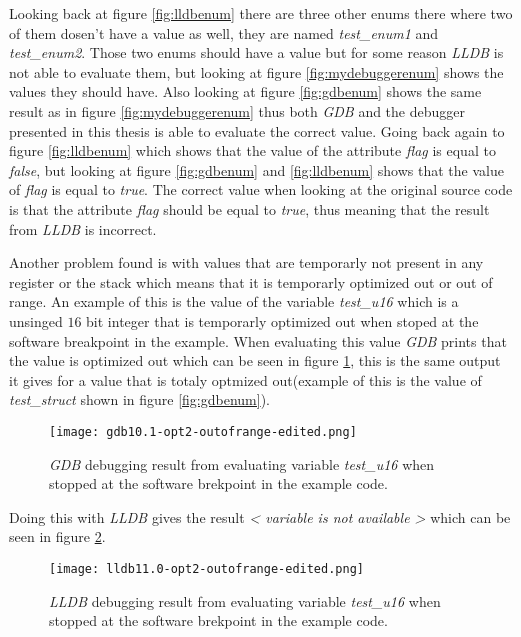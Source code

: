 Looking back at figure \ref{fig:lldbenum} there are three other enums there where two of them dosen't have a value as well, they are named \emph{test\_enum1} and \emph{test\_enum2}.
Those two enums should have a value but for some reason \emph{LLDB} is not able to evaluate them, but looking at figure \ref{fig:mydebuggerenum} shows the values they should have.
Also looking at figure \ref{fig:gdbenum} shows the same result as in figure \ref{fig:mydebuggerenum} thus both \emph{GDB} and the debugger presented in this thesis is able to evaluate the correct value.
Going back again to figure \ref{fig:lldbenum} which shows that the value of the attribute \emph{flag} is equal to \emph{false}, but looking at figure \ref{fig:gdbenum} and \ref{fig:lldbenum} shows that the value of \emph{flag} is equal to \emph{true}.
The correct value when looking at the original source code is that the attribute \emph{flag} should be equal to \emph{true}, thus meaning that the result from \emph{LLDB} is incorrect.


Another problem found is with values that are temporarly not present in any register or the stack which means that it is temporarly optimized out or out of range.
An example of this is the value of the variable \emph{test\_u16} which is a unsinged $16$ bit integer that is temporarly optimized out when stoped at the software breakpoint in the example.
When evaluating this value \emph{GDB} prints that the value is optimized out which can be seen in figure \ref{fig:gdboutofrange}, this is the same output it gives for a value that is totaly optmized out(example of this is the value of \emph{test\_struct} shown in figure \ref{fig:gdbenum}).


\begin{figure}[h]
	\centering
	\texttt{[image: gdb10.1-opt2-outofrange-edited.png]}
	\caption{\emph{GDB} debugging result from evaluating variable \emph{test\_u16} when stopped at the software brekpoint in the example code.}
    	\label{fig:gdboutofrange}
\end{figure}


Doing this with \emph{LLDB} gives the result  \emph{< variable is not available >} which can be seen in figure \ref{fig:lldboutofrange}.


\begin{figure}[h]
	\centering
	\texttt{[image: lldb11.0-opt2-outofrange-edited.png]}
	\caption{\emph{LLDB} debugging result from evaluating variable \emph{test\_u16} when stopped at the software brekpoint in the example code.}
	\label{fig:lldboutofrange}
\end{figure}


